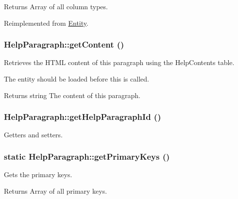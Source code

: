 \begin{DoxyReturn}{Returns}
Array of all column types. 
\end{DoxyReturn}


Reimplemented from \hyperlink{classEntity_ad69437219c10955803707fbf6ac458e7}{Entity}.

\hypertarget{classHelpParagraph_a20bb8d93c5018911f473df1d8f558f39}{
\subsubsection[{getContent}]{\setlength{\rightskip}{0pt plus 5cm}HelpParagraph::getContent ()}}
\label{classHelpParagraph_a20bb8d93c5018911f473df1d8f558f39}
Retrieves the HTML content of this paragraph using the HelpContents table.

The entity should be loaded before this is called.

\begin{DoxyReturn}{Returns}
string The content of this paragraph. 
\end{DoxyReturn}
\hypertarget{classHelpParagraph_a45d0b320057f827f2a0803822bd963ec}{
\subsubsection[{getHelpParagraphId}]{\setlength{\rightskip}{0pt plus 5cm}HelpParagraph::getHelpParagraphId ()}}
\label{classHelpParagraph_a45d0b320057f827f2a0803822bd963ec}
Getters and setters. \hypertarget{classHelpParagraph_af092a2b620b5efda2dd5f6dc695b9295}{
\subsubsection[{getPrimaryKeys}]{\setlength{\rightskip}{0pt plus 5cm}static HelpParagraph::getPrimaryKeys ()}}
\label{classHelpParagraph_af092a2b620b5efda2dd5f6dc695b9295}
Gets the primary keys.

\begin{DoxyReturn}{Returns}
Array of all primary keys. 
\end{DoxyReturn}


